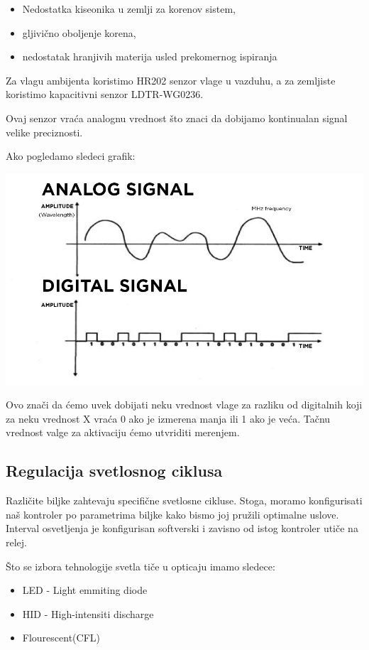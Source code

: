 \documentclass[a4paper,11pt]{book}
\begin{document}
\begin{itemize}
  \item Nedostatka kiseonika u zemlji za korenov sistem,
  \item gljivično oboljenje korena,
  \item nedostatak hranjivih materija usled prekomernog ispiranja
\end{itemize}

Za vlagu ambijenta koristimo HR202 senzor vlage u vazduhu, a za zemljiste koristimo kapacitivni senzor LDTR-WG0236.

Ovaj senzor vraća analognu vrednost što znaci da dobijamo kontinualan signal velike preciznosti. 

Ako pogledamo sledeci grafik:

\includegraphics[width=\textwidth]{digital-analog.jpg}

Ovo znači da ćemo uvek dobijati neku vrednost vlage za razliku od digitalnih koji za neku vrednost X vraća 0 ako je izmerena manja ili 1 ako je veća. Tačnu vrednost valge za aktivaciju ćemo utvriditi merenjem. 

\subsection{Regulacija svetlosnog ciklusa}
Različite biljke zahtevaju specifične svetlosne cikluse. Stoga, moramo konfigurisati naš kontroler po parametrima biljke kako bismo joj pružili optimalne uslove. Interval osvetljenja je konfigurisan softverski i zavisno od istog kontroler utiče na relej. 

Što se izbora tehnologije svetla tiče u opticaju imamo sledece:

\begin{itemize}
  \item LED - Light emmiting diode
  \item HID - High-intensiti discharge
  \item Flourescent(CFL)
\end{itemize}
\end{document}
